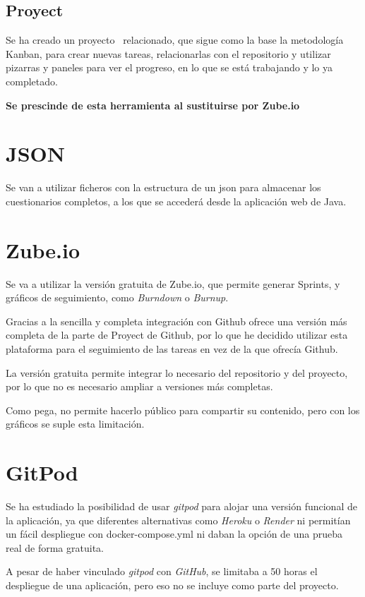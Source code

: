 \subsection{Proyect}

Se ha creado un proyecto~\cite{github:proyect} relacionado, que sigue como la base la metodología Kanban, para crear nuevas tareas, relacionarlas con el repositorio y utilizar pizarras y paneles para ver el progreso, en lo que se está trabajando y lo ya completado.

\textbf{Se prescinde de esta herramienta al sustituirse por Zube.io}

\section{JSON}

Se van a utilizar ficheros con la estructura de un json para almacenar los cuestionarios completos, a los que se accederá desde la aplicación web de Java.

\section{Zube.io}

Se va a utilizar la versión gratuita de Zube.io, que permite generar Sprints, y gráficos de seguimiento, como \textit{Burndown} o \textit{Burnup}.

Gracias a la sencilla y completa integración con Github ofrece una versión más completa de la parte de Proyect de Github, por lo que he decidido utilizar esta plataforma para el seguimiento de las tareas en vez de la que ofrecía Github.

La versión gratuita permite integrar lo necesario del repositorio y del proyecto, por lo que no es necesario ampliar a versiones más completas.

Como pega, no permite hacerlo público para compartir su contenido, pero con los gráficos se suple esta limitación.

\section{GitPod}

Se ha estudiado la posibilidad de usar \textit{gitpod} para alojar una versión funcional de la aplicación, ya que diferentes alternativas como \textit{Heroku} o \textit{Render} ni permitían un fácil despliegue con docker-compose.yml ni daban la opción de una prueba real de forma gratuita.

A pesar de haber vinculado \textit{gitpod} con \textit{GitHub}, se limitaba a 50 horas el despliegue de una aplicación, pero eso no se incluye como parte del proyecto.








